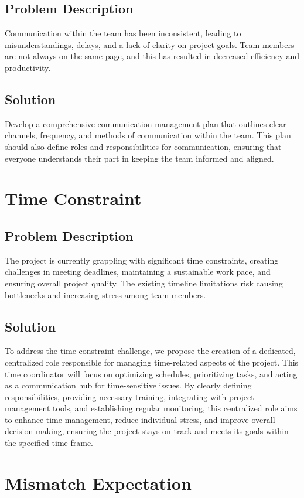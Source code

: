 \documentclass[12pt,titlepage,a4paper]{report}
\begin{document}
        \subsection{Problem Description}
        Communication within the team has been inconsistent, leading to misunderstandings, delays, and a lack of clarity on project goals. Team members are not always on the same page, and this has resulted in decreased efficiency and productivity.
        \subsection{Solution}
        Develop a comprehensive communication management plan that outlines clear channels, frequency, and methods of communication within the team. This plan should also define roles and responsibilities for communication, ensuring that everyone understands their part in keeping the team informed and aligned.
        \section{Time Constraint}
        \subsection{Problem Description}
        The project is currently grappling with significant time constraints, creating challenges in meeting deadlines, maintaining a sustainable work pace, and ensuring overall project quality. The existing timeline limitations risk causing bottlenecks and increasing stress among team members.
        \subsection{Solution}
        To address the time constraint challenge, we propose the creation of a dedicated, centralized role responsible for managing time-related aspects of the project. This time coordinator will focus on optimizing schedules, prioritizing tasks, and acting as a communication hub for time-sensitive issues. By clearly defining responsibilities, providing necessary training, integrating with project management tools, and establishing regular monitoring, this centralized role aims to enhance time management, reduce individual stress, and improve overall decision-making, ensuring the project stays on track and meets its goals within the specified time frame.
        \section{Mismatch Expectation}
\end{document}
